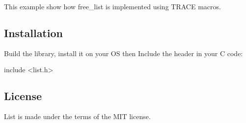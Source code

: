 This example show how {\ttfamily free\+\_\+list} is implemented using {\ttfamily T\+R\+A\+CE} macros.

\subsection*{Installation}

Build the library, install it on your OS then Include the header in your C code\+:


\begin{DoxyCode}
include <list.h>
\end{DoxyCode}


\subsection*{License}

List is made under the terms of the M\+IT license. 